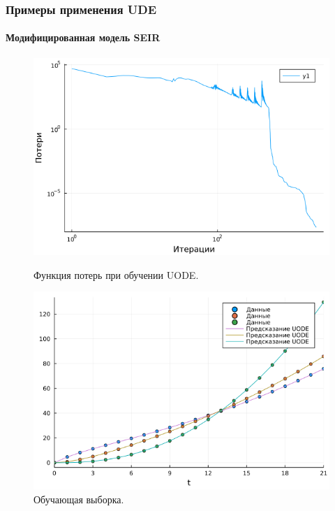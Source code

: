 \documentclass[10pt,pdf,hyperref={unicode}]{beamer}
\begin{document}
		
			\begin{frame}
				\frametitle{Примеры применения UDE} 
				\framesubtitle{Модифицированная модель SEIR}
				\begin{center}
					\begin{figure}[h!]
						\begin{minipage}{.45\textwidth}
							\includegraphics[width=\linewidth]{uode_loss.png}
							\caption{Функция потерь при обучении UODE.}
							\centering
						\end{minipage}
						\begin{minipage}{.45\textwidth}
							\includegraphics[width=\linewidth]{uode_prediction_train.png}
							\caption{Обучающая выборка.}
							\centering
						\end{minipage}
						\centering
					\end{figure}
				\end{center}
			\end{frame}
		
\end{document}
